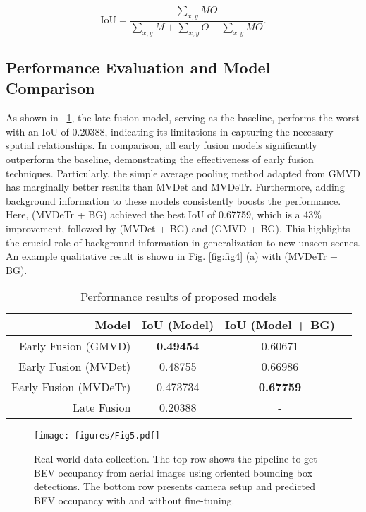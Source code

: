 \begin{equation}
    \text{IoU} = \frac{\sum_{x,y}MO}{\sum_{x,y}M + \sum_{x,y}O - \sum_{x,y}MO}.
\end{equation}

\subsection{Performance Evaluation and Model Comparison}

As shown in \tableautorefname~\ref{tab:model_results}, the late fusion model, serving as the baseline, performs the worst with an IoU of 0.20388, indicating its limitations in capturing the necessary spatial relationships. In comparison, all early fusion models significantly outperform the baseline, demonstrating the effectiveness of early fusion techniques. Particularly, the simple average pooling method adapted from GMVD has marginally better results than MVDet and MVDeTr. Furthermore, adding background information to these models consistently boosts the performance. Here, (MVDeTr + BG) achieved the best IoU of 0.67759, which is a 43\% improvement, followed by (MVDet + BG) and (GMVD + BG).  This highlights the crucial role of background information in generalization to new unseen scenes. An example qualitative result is shown in Fig. \ref{fig:fig4} (a) with (MVDeTr + BG).

\begin{table}[h]
\centering
\begin{tabular}{rccc}
\hline
\textbf{Model} & \textbf{IoU (Model)} & \textbf{IoU (Model + BG)} \\ \hline
Early Fusion (GMVD) & \textbf{0.49454} & 0.60671 \\
Early Fusion (MVDet) & 0.48755 & 0.66986 \\ 
Early Fusion (MVDeTr) & 0.473734 & \textbf{0.67759} \\
\hline
Late Fusion & 0.20388 & -\\

\hline
\end{tabular}
\caption{Performance results of proposed models}
\label{tab:model_results}
\vspace{-0.2in}
\end{table}

\begin{figure*}[!th]
    \centering
    \texttt{[image: figures/Fig5.pdf]}
    \caption{Real-world data collection. The top row shows the pipeline to get BEV occupancy from aerial images using oriented bounding box detections. The bottom row presents camera setup and predicted BEV occupancy with and without fine-tuning.}
    \label{fig:fig5}
\vspace{-0.2in}
\end{figure*}
